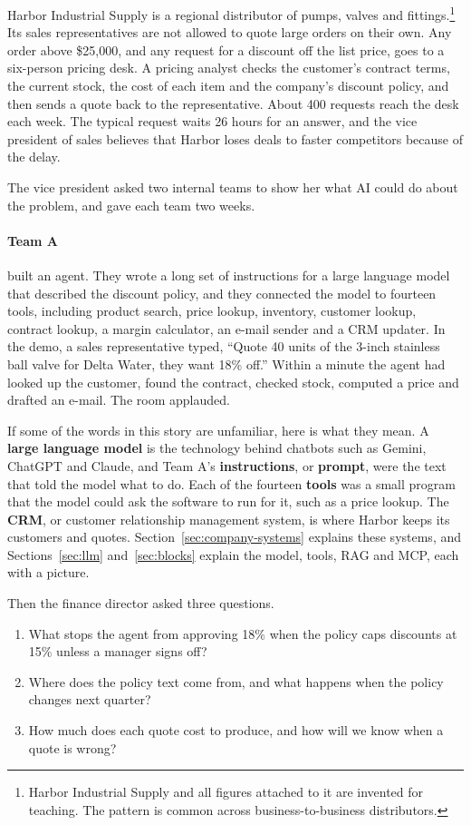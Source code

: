 Harbor Industrial Supply is a regional distributor of pumps, valves and fittings.\footnote{Harbor Industrial Supply and all figures attached to it are invented for teaching. The pattern is common across business-to-business distributors.} Its sales representatives are not allowed to quote large orders on their own. Any order above \$25{,}000, and any request for a discount off the list price, goes to a six-person pricing desk. A pricing analyst checks the customer's contract terms, the current stock, the cost of each item and the company's discount policy, and then sends a quote back to the representative. About 400 requests reach the desk each week. The typical request waits 26 hours for an answer, and the vice president of sales believes that Harbor loses deals to faster competitors because of the delay.

The vice president asked two internal teams to show her what AI could do about the problem, and gave each team two weeks.

\paragraph{Team A} built an agent. They wrote a long set of instructions for a large language model that described the discount policy, and they connected the model to fourteen tools, including product search, price lookup, inventory, customer lookup, contract lookup, a margin calculator, an e-mail sender and a CRM updater. In the demo, a sales representative typed, ``Quote 40 units of the 3-inch stainless ball valve for Delta Water, they want 18\% off.'' Within a minute the agent had looked up the customer, found the contract, checked stock, computed a price and drafted an e-mail. The room applauded.

If some of the words in this story are unfamiliar, here is what they mean. A \textbf{large language model} is the technology behind chatbots such as Gemini, ChatGPT and Claude, and Team A's \textbf{instructions}, or \textbf{prompt}, were the text that told the model what to do. Each of the fourteen \textbf{tools} was a small program that the model could ask the software to run for it, such as a price lookup. The \textbf{CRM}, or customer relationship management system, is where Harbor keeps its customers and quotes. Section~\ref{sec:company-systems} explains these systems, and Sections~\ref{sec:llm} and~\ref{sec:blocks} explain the model, tools, RAG and MCP, each with a picture.


Then the finance director asked three questions. 
\begin{enumerate}
\item What stops the agent from approving 18\% when the policy caps discounts at 15\% unless a manager signs off? 
\item Where does the policy text come from, and what happens when the policy changes next quarter? 
\item How much does each quote cost to produce, and how will we know when a quote is wrong? 
\end{enumerate}

